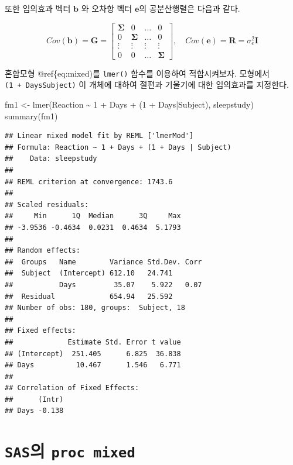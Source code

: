 \documentclass[
]{book}
\newenvironment{Shaded}{\begin{snugshade}}{\end{snugshade}}
\newcommand{\DecValTok}[1]{\textcolor[rgb]{0.00,0.00,0.81}{#1}}
\newcommand{\FunctionTok}[1]{\textcolor[rgb]{0.00,0.00,0.00}{#1}}
\newcommand{\NormalTok}[1]{#1}
\newcommand{\OtherTok}[1]{\textcolor[rgb]{0.56,0.35,0.01}{#1}}
\newcommand{\SpecialCharTok}[1]{\textcolor[rgb]{0.00,0.00,0.00}{#1}}
\theoremstyle{definition}
\theoremstyle{definition}
\theoremstyle{definition}
\theoremstyle{remark}
\begin{document}
또한 임의효과 벡터 \(\bm b\) 와 오차항 벡터 \(\bm e\)의 공분산행렬은 다음과 같다.

\[ 
Cov(\bm b) = \bm G = 
\begin{bmatrix}
\bm \Sigma & 0 & \dots & 0 \\
0   & \bm \Sigma & \dots & 0 \\
\vdots & \vdots & \vdots & \vdots  \\
0 & 0 & \dots & \bm \Sigma
\end{bmatrix}, \quad
Cov(\bm e) = \bm R = \sigma_e^2 \bm I
\]

혼합모형 @ref\{eq:mixed)를 \texttt{lmer()} 함수를 이용하여 적합시켜보자. 모형에서 \texttt{(1\ +\ Days\textbar{}Subject)} 이 개체에 대하여 절편과 기울기에 대한 임의효과를 지정한다.

\begin{Shaded}
\begin{Highlighting}[]
\NormalTok{fm1 }\OtherTok{\textless{}{-}} \FunctionTok{lmer}\NormalTok{(Reaction }\SpecialCharTok{\textasciitilde{}} \DecValTok{1} \SpecialCharTok{+}\NormalTok{ Days }\SpecialCharTok{+}\NormalTok{ (}\DecValTok{1} \SpecialCharTok{+}\NormalTok{ Days}\SpecialCharTok{|}\NormalTok{Subject), sleepstudy)}
\FunctionTok{summary}\NormalTok{(fm1)}
\end{Highlighting}
\end{Shaded}

\begin{verbatim}
## Linear mixed model fit by REML ['lmerMod']
## Formula: Reaction ~ 1 + Days + (1 + Days | Subject)
##    Data: sleepstudy
## 
## REML criterion at convergence: 1743.6
## 
## Scaled residuals: 
##     Min      1Q  Median      3Q     Max 
## -3.9536 -0.4634  0.0231  0.4634  5.1793 
## 
## Random effects:
##  Groups   Name        Variance Std.Dev. Corr
##  Subject  (Intercept) 612.10   24.741       
##           Days         35.07    5.922   0.07
##  Residual             654.94   25.592       
## Number of obs: 180, groups:  Subject, 18
## 
## Fixed effects:
##             Estimate Std. Error t value
## (Intercept)  251.405      6.825  36.838
## Days          10.467      1.546   6.771
## 
## Correlation of Fixed Effects:
##      (Intr)
## Days -0.138
\end{verbatim}

\hypertarget{sasuxc758-proc-mixed}{%
\section{\texorpdfstring{\texttt{SAS}의 \texttt{proc\ mixed}}{SAS의 proc mixed}}\label{sasuxc758-proc-mixed}}
\end{document}
